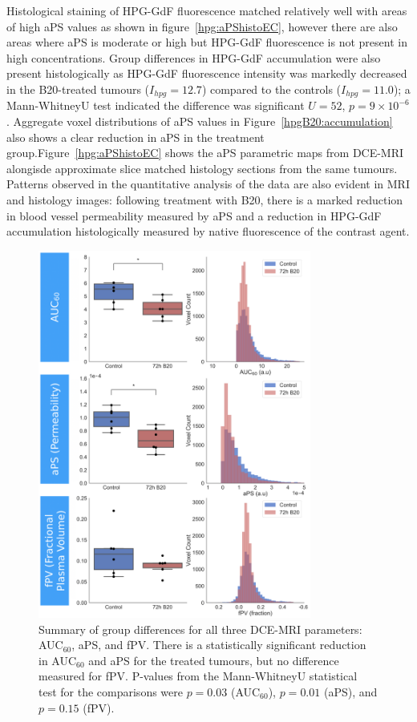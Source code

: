 Histological staining of \acs{HPG-GdF} fluorescence matched relatively well with areas of high \acs{aPS} values as shown in figure~\ref{hpg:aPShistoEC}, however there are also areas where aPS is moderate or high but \acs{HPG-GdF} fluorescence is not present in high concentrations. 
Group differences in \acs{HPG-GdF} accumulation were also present histologically as \acs{HPG-GdF} fluorescence intensity was markedly decreased in the B20-treated tumours ($I_{hpg} = 12.7$) compared to the controls ($I_{hpg} = 11.0$); a Mann-WhitneyU test indicated the difference was significant $U = 52$, $p = 9\times10^{-6}$.
Aggregate voxel distributions of \acs{aPS} values in Figure~\ref{hpgB20:accumulation} also shows a clear reduction in \acs{aPS} in the treatment group.Figure~\ref{hpg:aPShistoEC} shows the \acs{aPS} parametric maps from \acs{DCE-MRI} alongisde approximate slice matched histology sections from the same tumours.
Patterns observed in the quantitative analysis of the data are also evident in MRI and histology images: following treatment with B20, there is a marked reduction in blood vessel permeability measured by \acs{aPS} and a reduction in \acs{HPG-GdF} accumulation histologically measured by native fluorescence of the contrast agent.

\begin{figure}[htbp] %
  \centering
  \includegraphics[width=0.8\textwidth]{hpg/hpg-B20-images/hpg_mriparams.png} 
  \caption{Summary of group differences for all three \acs{DCE-MRI} parameters: \acs{AUC}$_{60}$, \acs{aPS}, and \acs{fPV}. 
  There is a statistically significant reduction in \acs{AUC}$_{60}$ and \acs{aPS} for the treated tumours, but no difference measured for \acs{fPV}.
  P-values from the Mann-WhitneyU statistical test for the comparisons were $p=0.03$ (\acs{AUC}$_{60}$), $p=0.01$ (\acs{aPS}), and $p=0.15$ (\acs{fPV}).}
  \label{hpgB20:mriparams}
\end{figure}

